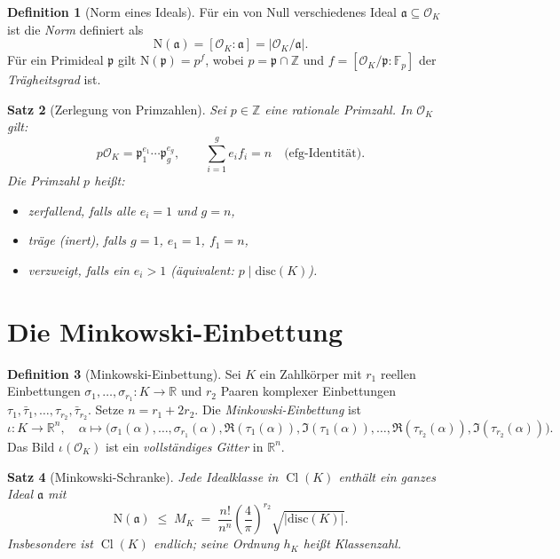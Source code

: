 \documentclass[12pt,a4paper]{amsart}
\newtheorem{theorem}{Satz}[section]
\theoremstyle{definition}
\newtheorem{definition}[theorem]{Definition}
\newcommand{\Z}{\mathbb{Z}}
\newcommand{\R}{\mathbb{R}}
\newcommand{\F}{\mathbb{F}}
\newcommand{\OK}{\mathcal{O}_K}
\newcommand{\p}{\mathfrak{p}}
\newcommand{\aaa}{\mathfrak{a}}
\newcommand{\Nm}{\mathrm{N}}
\newcommand{\disc}{\mathrm{disc}}
\DeclareMathOperator{\Cl}{Cl}
\begin{document}
\begin{definition}[Norm eines Ideals]
\label{def:ideal_norm}
Für ein von Null verschiedenes Ideal $\aaa \subseteq \OK$ ist die
\emph{Norm} definiert als
\[
  \Nm(\aaa) = [\OK : \aaa] = |\OK/\aaa|.
\]
Für ein Primideal $\p$ gilt $\Nm(\p) = p^f$, wobei $p = \p \cap \Z$ und
$f = [\OK/\p : \F_p]$ der \emph{Trägheitsgrad} ist.
\end{definition}

\begin{theorem}[Zerlegung von Primzahlen]
\label{thm:zerlegung}
Sei $p \in \Z$ eine rationale Primzahl.  In $\OK$ gilt:
\[
  p\OK = \p_1^{e_1} \cdots \p_g^{e_g},
  \qquad \sum_{i=1}^g e_i f_i = n \quad\text{(efg-Identität)}.
\]
Die Primzahl $p$ heißt:
\begin{itemize}
  \item \emph{zerfallend}, falls alle $e_i = 1$ und $g = n$,
  \item \emph{träge} (inert), falls $g = 1$, $e_1 = 1$, $f_1 = n$,
  \item \emph{verzweigt}, falls ein $e_i > 1$ (äquivalent: $p \mid \disc(K)$).
\end{itemize}
\end{theorem}

\section{Die Minkowski-Einbettung}

\begin{definition}[Minkowski-Einbettung]
\label{def:mink_emb}
Sei $K$ ein Zahlkörper mit $r_1$ reellen Einbettungen $\sigma_1, \ldots, \sigma_{r_1} : K \to \R$
und $r_2$ Paaren komplexer Einbettungen $\tau_1, \bar\tau_1, \ldots, \tau_{r_2}, \bar\tau_{r_2}$.
Setze $n = r_1 + 2r_2$.  Die \emph{Minkowski-Einbettung} ist
\[
  \iota : K \longrightarrow \R^n, \quad
  \alpha \longmapsto
  \bigl(\sigma_1(\alpha), \ldots, \sigma_{r_1}(\alpha),
        \Re(\tau_1(\alpha)), \Im(\tau_1(\alpha)), \ldots,
        \Re(\tau_{r_2}(\alpha)), \Im(\tau_{r_2}(\alpha))\bigr).
\]
Das Bild $\iota(\OK)$ ist ein \emph{vollständiges Gitter} in $\R^n$.
\end{definition}

\begin{theorem}[Minkowski-Schranke]
\label{thm:mink_schranke}
Jede Idealklasse in $\Cl(K)$ enthält ein ganzes Ideal $\aaa$ mit
\[
  \Nm(\aaa) \;\le\; M_K
  \;=\; \frac{n!}{n^n} \left(\frac{4}{\pi}\right)^{r_2} \sqrt{|\disc(K)|}.
\]
Insbesondere ist $\Cl(K)$ \emph{endlich}; seine Ordnung $h_K$ heißt
\emph{Klassenzahl}.
\end{theorem}
\end{document}
